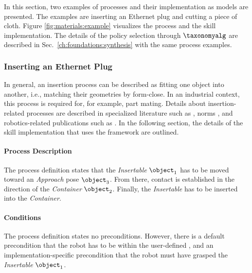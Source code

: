 In this section, two examples of processes and their implementation as \skillmodelabbr{} models are presented.
The examples are inserting an Ethernet plug and cutting a piece of cloth.
Figure \ref{fig:materials:example} visualizes the process and the skill implementation.
The details of the policy selection through $\taxonomyalg$ are described in Sec.~\ref{ch:foundations:synthesis} with the same process examples.

\begin{figure*}[ht!]
    \centering
    
    \caption{The two examples show the process description and their corresponding \skillmodelabbr{} models.}
    \label{fig:materials:example}
\end{figure*}

\subsubsection{Inserting an Ethernet Plug}

In general, an insertion process can be described as fitting one object into another, i.e., matching their geometries by form-close.
In an industrial context, this process is required for, for example, part mating.
Details about insertion-related processes are described in specialized literature such as \cite{Feldmann.2014}, norms \cite{DeutschesInstitutfurNormung.01.09.2003}, and robotics-related publications such as \cite{Broenink.1996,Chhatpar.2001}.
In the following section, the details of the skill implementation that uses the \skillmodelabbr{} framework are outlined.

\paragraph{Process Description}

The process definition states that the \textit{Insertable} $\object_1$ has to be moved toward an \textit{Approach} pose $\object_3$.
From there, contact is established in the direction of the \textit{Container} $\object_2$.
Finally, the \textit{Insertable} has to be inserted into the \textit{Container}.

\paragraph{Conditions}

The process definition states no preconditions.
However, there is a default precondition that the robot has to be within the user-defined \roi, and an implementation-specific precondition that the robot must have grasped the \textit{Insertable} $\object_1$.

